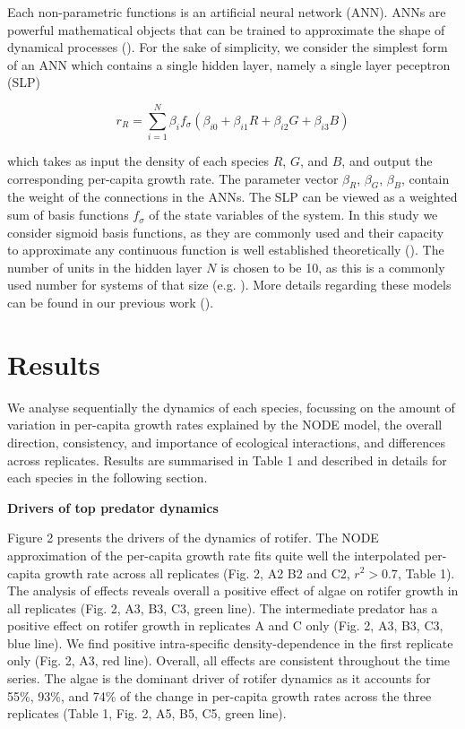 \documentclass[11pt, oneside]{article}
\begin{document}
Each non-parametric functions is an artificial neural network (ANN).
ANNs are powerful mathematical objects that can be trained to approximate the shape of dynamical processes (\cite{Funahashi1993, Chen1993}).
For the sake of simplicity, we consider the simplest form of an ANN which contains a single hidden layer, namely a single layer peceptron (SLP)

\begin{equation}
	r_R = \sum_{i=1}^{N} \beta_{i} f_{\sigma} \left( \beta_{i0} + \beta_{i1} R + \beta_{i2} G + \beta_{i3} B \right) 
\end{equation}

which takes as input the density of each species $R$, $G$, and $B$, and output the corresponding per-capita growth rate.
The parameter vector $\beta_R$, $\beta_G$, $\beta_B$, contain the weight of the connections in the ANNs.
The SLP can be viewed as a weighted sum of basis functions $f_\sigma$ of the state variables of the system.
In this study we consider sigmoid basis functions, as they are commonly used and their capacity to approximate any continuous function is well established theoretically (\cite{Funahashi1993}). 
The number of units in the hidden layer $N$ is chosen to be 10, as this is a commonly used number for systems of that size (e.g. \cite{Wu2005}). 
More details regarding these models can be found in our previous work (\cite{Bonnaffe2021a}).

\section{Results}

We analyse sequentially the dynamics of each species, focussing on the amount of variation in per-capita growth rates explained by the NODE model, the overall direction, consistency, and importance of ecological interactions, and differences across replicates.
Results are summarised in Table 1 and described in details for each species in the following section.


\textbf{Drivers of top predator dynamics}

Figure 2 presents the drivers of the dynamics of rotifer.
The NODE approximation of the per-capita growth rate fits quite well the interpolated per-capita growth rate across all replicates (Fig. 2, A2 B2 and C2, $r^2 > 0.7$, Table 1).
The analysis of effects reveals overall a positive effect of algae on rotifer growth in all replicates (Fig. 2, A3, B3, C3, green line). 
The intermediate predator has a positive effect on rotifer growth in replicates A and C only (Fig. 2, A3, B3, C3, blue line).
We find positive intra-specific density-dependence in the first replicate only (Fig. 2, A3, red line).
Overall, all effects are consistent throughout the time series.
The algae is the dominant driver of rotifer dynamics as it accounts for 55\%, 93\%, and 74\% of the change in per-capita growth rates across the three replicates (Table 1, Fig. 2, A5, B5, C5, green line).
\end{document}
